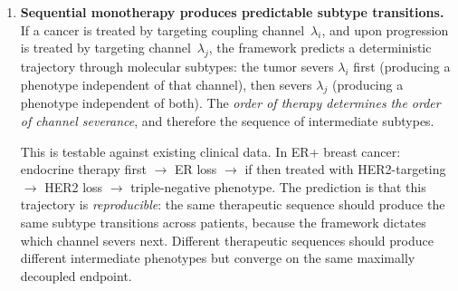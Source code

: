 \documentclass[11pt]{article}
\theoremstyle{definition}
\theoremstyle{remark}
\begin{document}
\begin{enumerate}
   The gradient is consistent with the framework's prediction:
   agents damaging independent coupling channels
   ($\lambda_i \perp \lambda_j$) produce multiplicative or
   super-multiplicative risk; agents with partial channel overlap
   produce sub-multiplicative risk; agents acting through the same
   channel produce additive risk. This pattern has been observed
   empirically but lacks a unified theoretical explanation.
   The Armitage--Doll multistage model \cite{Armitage1954} captures
   the same structure formally---two agents affecting different
   ``stages'' yield multiplicative risk, while agents affecting the
   same stage yield additive risk---but does not identify what the
   stages \emph{are}. The coupling-channel framework provides the
   identification: stages are coupling channels, and the interaction
   type is determined by whether the agents degrade the same or
   different channels.

   \textbf{The testable refinement:} for any pair of carcinogens
   whose interaction type is currently unknown, the framework
   predicts the interaction from the coupling-channel assignment
   \emph{before} the epidemiological data are collected. This
   converts the prediction from a post-hoc explanation of known
   interactions to a prospective classification tool.

\item \textbf{Sequential monotherapy produces predictable subtype
   transitions.} If a cancer is treated by targeting coupling
   channel~$\lambda_i$, and upon progression is treated by targeting
   channel~$\lambda_j$, the framework predicts a deterministic
   trajectory through molecular subtypes: the tumor severs
   $\lambda_i$ first (producing a phenotype independent of that
   channel), then severs $\lambda_j$ (producing a phenotype
   independent of both). The \emph{order of therapy determines the
   order of channel severance}, and therefore the sequence of
   intermediate subtypes.

   This is testable against existing clinical data. In ER+ breast
   cancer: endocrine therapy first $\to$ ER loss $\to$ if then
   treated with HER2-targeting $\to$ HER2 loss $\to$ triple-negative
   phenotype. The prediction is that this trajectory is
   \emph{reproducible}: the same therapeutic sequence should produce
   the same subtype transitions across patients, because the
   framework dictates which channel severs next. Different
   therapeutic sequences should produce different intermediate
   phenotypes but converge on the same maximally decoupled endpoint.


\end{enumerate}
\end{document}
